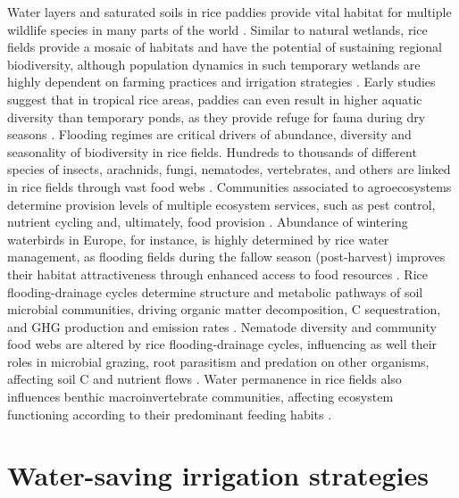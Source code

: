 Water layers and saturated soils in rice paddies provide vital habitat for multiple wildlife species in many parts of the world \citep{katayama2019}. Similar to natural wetlands, rice fields provide a mosaic of habitats and have the potential of sustaining regional biodiversity, although population dynamics in such temporary wetlands are highly dependent on farming practices and irrigation strategies \citep{fasola1996}. Early studies suggest that in tropical rice areas, paddies can even result in higher aquatic diversity than temporary ponds, as they provide refuge for fauna during dry seasons \citep{heckman1979rice}. Flooding regimes are critical drivers of abundance, diversity and seasonality of biodiversity in rice fields. Hundreds to thousands of different species of insects, arachnids, fungi, nematodes, vertebrates, and others are linked in rice fields through vast food webs \citep{schoenly1996food}. Communities associated to agroecosystems determine provision levels of multiple ecosystem services, such as pest control, nutrient cycling and, ultimately, food provision \citep{tixier2013food}. Abundance of wintering waterbirds in Europe, for instance, is highly determined by rice water management, as flooding fields during the fallow season (post-harvest) improves their habitat attractiveness through enhanced access to food resources \citep{pernollet2015}. Rice flooding-drainage cycles determine structure and metabolic pathways of soil microbial communities, driving organic matter decomposition, C sequestration, and GHG production and emission rates \citep{conrad2020}. Nematode diversity and community food webs are altered by rice flooding-drainage cycles, influencing as well their roles in microbial grazing, root parasitism and predation on other organisms, affecting soil C and nutrient flows \citep{yeates2003nematodes, okada2011, mokuah2023food}. Water permanence in rice fields also influences benthic macroinvertebrate communities, affecting ecosystem functioning according to their predominant feeding habits \citep{lupi2013, lupi2014}.\\  


\section*{Water-saving irrigation strategies}

